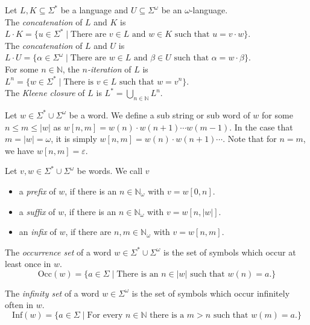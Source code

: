 \begin{defn}
	Let $L, K \subseteq \Sigma^*$ be a language and $U \subseteq \Sigma^\omega$ be an $\omega$-language.\\
	The \emph{concatenation} of $L$ and $K$ is $L \cdot K = \{ u \in \Sigma^* \mid \text{There are } v \in L \text{ and } \allowbreak w \in K \text{ such that } u = v \cdot w\}$.\\
	The \emph{concatenation} of $L$ and $U$ is $L \cdot U = \{ \alpha \in \Sigma^\omega \mid \text{There are } w \in L \text{ and } \allowbreak \beta \in U \text{ such that } \alpha = w \cdot \beta\}$.\\
	For some $n \in \mathbb{N}$, the \emph{$n$-iteration} of $L$ is $L^n = \{ w \in \Sigma^* \mid \text{There is } v \in L \text{ such that } w = v^n\}$.\\
	The \emph{Kleene closure} of $L$ is $L^* = \bigcup\limits_{n \in \mathbb{N}} L^n$.\\
\end{defn}

\begin{defn}
	Let $w \in \Sigma^* \cup \Sigma^\omega$ be a word. We define a sub string or sub word of $w$ for some $n \leq m \leq |w|$ as $w[n, m] = w(n) \cdot w(n+1) \cdots w(m-1)$. In the case that $m = |w| = \omega$, it is simply $w[n, m] = w(n) \cdot w(n+1) \cdots$. Note that for $n = m$, we have $w[n, m] = \varepsilon$.
\end{defn}

\begin{defn}
	Let $v, w \in \Sigma^* \cup \Sigma^\omega$ be words. We call $v$ 
	\begin{itemize}
		\item a \emph{prefix} of $w$, if there is an $n \in \mathbb{N}_\omega$ with $v = w[0, n]$.
		\item a \emph{suffix} of $w$, if there is an $n \in \mathbb{N}_\omega$ with $v = w[n, |w|]$.
		\item an \emph{infix} of $w$, if there are $n, m \in \mathbb{N}_\omega$ with $v = w[n, m]$.
	\end{itemize}
\end{defn}

\begin{defn}
	The \emph{occurrence set} of a word $w \in \Sigma^* \cup \Sigma^\omega$ is the set of symbols which occur at least once in $w$. 
	$$\text{Occ}(w) = \{ a \in \Sigma \mid \text{There is an } n \in |w| \text{ such that } w(n) = a \text{.}\}$$
	
	The \emph{infinity set} of a word $w \in \Sigma^\omega$ is the set of symbols which occur infinitely often in $w$.
	$$\text{Inf}(w) = \{ a \in \Sigma \mid \text{For every } n \in \mathbb{N} \text{ there is a } m > n \text{ such that } w(m) = a \text{.}\}$$
\end{defn}

